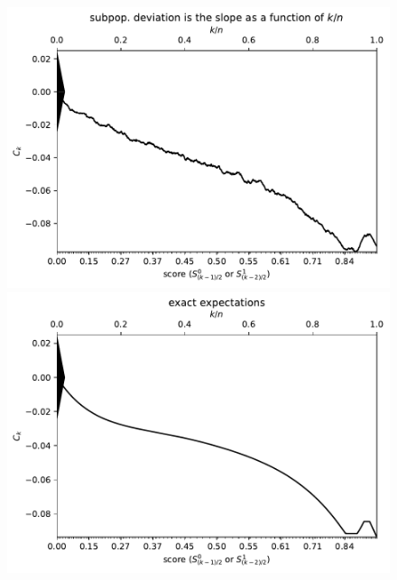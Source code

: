 \documentclass{article}
\newlength{\vertsep}
\newlength{\imsize}
\begin{document}
\begin{figure}
\begin{centering}

\parbox{\imsize}{\includegraphics[width=\imsize]
{../codes/unweighted/10000_7000_10_0/cumulative.pdf}}
\quad\quad
\parbox{\imsize}{\includegraphics[width=\imsize]
{../codes/unweighted/10000_7000_10_0/cumulative_exact.pdf}}

\vspace{\vertsep}


\end{centering}
\end{figure}
\end{document}
